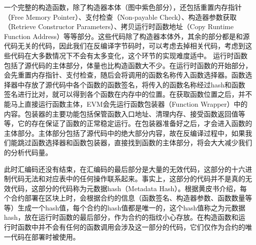 一个完整的构造函数，除了构造器本体（图中紫色部分），还包括重置内存指针（Free Memory Pointer）、支付检查（Non-payable Check）、构造器参数获取（Retrieve Constructor Parameters）、拷贝运行时函数地址（Copy Runtime Function Address）等等部分。这些代码除了构造器本体外，其余的部分都是和源代码无关的代码，因此我们在反编译字节码时，可以考虑去掉相关代码，考虑到这些代码在大多数情况下不会有太多变化，这个环节的实现难度适中。
运行时函数包括了源代码的主体部分，体量也比构造函数大不少。在运行时函数的开始部分，会先重置内存指针、支付检查，随后会将调用的函数名称传入函数选择器。函数选择器中存放了源代码中各个函数的函数签名，将传入的函数名称经过hash和函数签名进行比对，就可以得到各个函数在内存中的位置。在获取函数位置之后，并不能马上直接运行函数主体，EVM会先运行函数包装器（Function Wrapper）中的内容。包装器的主要功能包括保管函数入口地址、清理内存、接受函数返回值等等，它的存在保证了函数的正常稳定运行。在包装器准备好之后，才会进入函数的主体部分。主体部分包括了源代码中的绝大部分内容，故在反编译过程中，如果我们能跳过函数选择器和函数包装器，直接找到函数的主体部分，将会大大减少我们的分析代码量。

此时汇编码还没有结束，在汇编码的最后部分是大量的无效代码，这部分的十六进制代码无法和对应表中的任何操作联系起来。事实上，这部分的代码并不是真的无效代码，这部分的代码称为元数据hash（Metadata Hash）。根据黄皮书介绍，每个合约部署在区块上时，会根据合约的信息（函数签名、构造器参数、函数数量等等）生成一个hash值，每个合约的hash值都是唯一的，这个hash值称之为元数据hash，放在运行时函数的最后部分，作为合约的指纹小心存放。在构造函数和运行时函数中并不会有任何的函数调用会涉及这一部分的代码，它们仅作为合约的唯一代码在部署时被使用。
